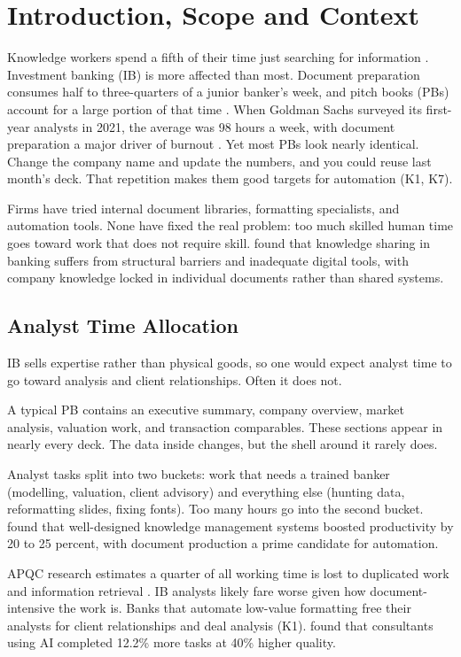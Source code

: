 \section{Introduction, Scope and Context}
\label{sec:introduction}

Knowledge workers spend a fifth of their time just searching for information \parencite{mckinsey2012}. Investment banking (IB) is more affected than most. Document preparation consumes half to three-quarters of a junior banker's week, and pitch books (PBs) account for a large portion of that time \parencite{cfi2025,wso2024}. When Goldman Sachs surveyed its first-year analysts in 2021, the average was 98 hours a week, with document preparation a major driver of burnout \parencite{bbc2021}. Yet most PBs look nearly identical. Change the company name and update the numbers, and you could reuse last month's deck. That repetition makes them good targets for automation (K1, K7).

Firms have tried internal document libraries, formatting specialists, and automation tools. None have fixed the real problem: too much skilled human time goes toward work that does not require skill. \textcite{chaves2022} found that knowledge sharing in banking suffers from structural barriers and inadequate digital tools, with company knowledge locked in individual documents rather than shared systems.

\subsection{Analyst Time Allocation}

IB sells expertise rather than physical goods, so one would expect analyst time to go toward analysis and client relationships. Often it does not.

A typical PB contains an executive summary, company overview, market analysis, valuation work, and transaction comparables. These sections appear in nearly every deck. The data inside changes, but the shell around it rarely does.

Analyst tasks split into two buckets: work that needs a trained banker (modelling, valuation, client advisory) and everything else (hunting data, reformatting slides, fixing fonts). Too many hours go into the second bucket. \textcite{radhakrishna2024} found that well-designed knowledge management systems boosted productivity by 20 to 25 percent, with document production a prime candidate for automation.

APQC research estimates a quarter of all working time is lost to duplicated work and information retrieval \parencite{apqc2023}. IB analysts likely fare worse given how document-intensive the work is. Banks that automate low-value formatting free their analysts for client relationships and deal analysis (K1). \textcite{dellacqua2023} found that consultants using AI completed 12.2\% more tasks at 40\% higher quality.


